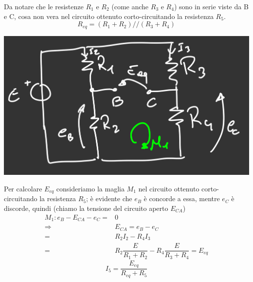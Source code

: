\documentclass{article}
\begin{document}
Da notare che le resistenze $R_1$ e $R_2$ (come anche $R_3$ e $R_4$) sono in serie viste da B e C, cosa non vera nel circuito ottenuto corto-circuitando la resistenza $R_5$.
\[
    R_{eq} = (R_1+R_2) // (R_3+R_4)
\]
\begin{center}
    \includegraphics[scale=0.3]{Image/Esercizio_Thevenin_4.png}
\end{center}
Per calcolare $E_{eq}$ consideriamo la maglia $M_1$ nel circuito ottenuto corto-circuitando la resistenza $R_5$; è evidente che $e_B$ è concorde a essa, mentre $e_C$ è discorde, quindi (chiamo la tensione del circuito aperto $E_{CA}$)
\begin{align*}
    M_1: e_B - E_{CA} - e_C=&0\\
    \Longrightarrow& E_{CA} = e_B - e_C\\
    =& R_2I_2 - R_4I_3\\
    =&R_2 \dfrac{E}{R_1+R_2} - R_4 \dfrac{E}{R_3+R_4} = E_{eq}
\end{align*}
\[
    I_5 = \frac{E_{eq}}{R_{eq}+R_5}
\]
\end{document}
